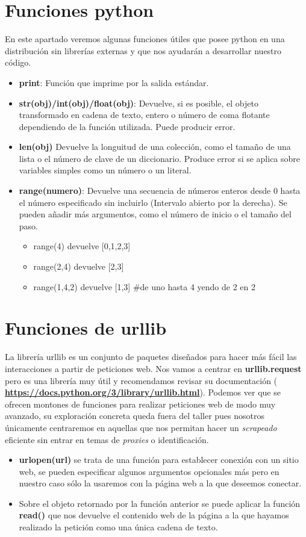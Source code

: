 \documentclass{article}
\begin{document}
\section{Funciones python}
	\justify
	En este apartado veremos algunas funciones útiles que posee 
	python en una distribución sin librerías externas y que nos ayudarán
	a desarrollar nuestro código.
	\begin{itemize}
		\item \textbf{print}: Función que imprime por la salida estándar.
		\item \textbf{str(obj)/int(obj)/float(obj)}: Devuelve, si es posible, el objeto transformado en cadena de 
		texto, entero o número de coma flotante dependiendo de la función utilizada. Puede producir error.
		\item \textbf{len(obj)} Devuelve la longuitud de una colección, como el tamaño de una lista o el número 
		de clave de un diccionario. Produce error si se aplica sobre variables simples como un número o un literal.
		\item \textbf{range(numero)}: Devuelve una secuencia de números enteros desde 0 hasta el número especificado
		sin incluirlo (Intervalo abierto por la derecha). Se pueden añadir más argumentos, como el número de inicio 
		o el tamaño del paso.\\
		\begin{itemize}
			\item range(4) devuelve [0,1,2,3]
			\item range(2,4) devuelve [2,3]
			\item range(1,4,2) devuelve [1,3] \#de uno hasta 4 yendo de 2 en 2
		\end{itemize}
	\end{itemize}
\section{Funciones de urllib}
	\justify
	La librería urllib es un conjunto de paquetes diseñados para hacer más fácil las interacciones a partir de peticiones web.
	Nos vamos a centrar en \textbf{urllib.request} pero es una librería muy útil y recomendamos revisar su documentación (
	\textbf{\url{https://docs.python.org/3/library/urllib.html}}). Podemos ver que se ofrecen montones de funciones para
	realizar peticiones web de modo muy avanzado, su exploración concreta queda fuera del taller pues nosotros únicamente
	centraremos en aquellas que nos permitan hacer un \textit{scrapeado} eficiente sin entrar en temas de \textit{proxies} o identificación.
	\begin{itemize} 
		\item \textbf{urlopen(url)} se trata de una función para establecer conexión con un sitio web, se pueden
		especificar algunos argumentos opcionales más pero en nuestro caso sólo la usaremos con la página web 
		a la que deseemos conectar.
		\item Sobre el objeto retornado por la función anterior se puede aplicar la función \textbf{read()} que 
		nos devuelve el contenido web de la página a la que hayamos realizado la petición como una única cadena de
		texto.
	\end{itemize}
	
\end{document}
